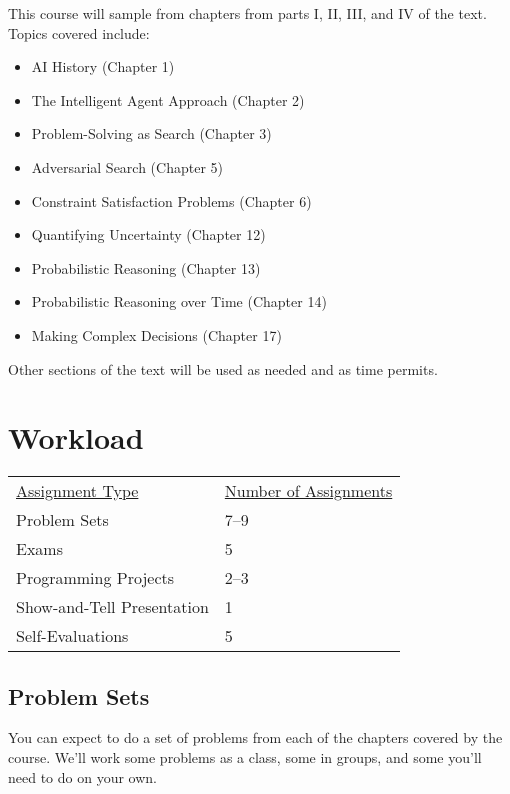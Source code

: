 \documentclass[10pt]{article}
\begin{document}
This course will sample from chapters from parts I, II, III, and IV of the text. Topics covered include:
\begin{itemize}
\item AI History (Chapter 1) %
\item The Intelligent Agent Approach (Chapter 2) %
\item Problem-Solving as Search (Chapter 3) %
\item Adversarial Search (Chapter 5) %
\item Constraint Satisfaction Problems (Chapter 6)
\item Quantifying Uncertainty (Chapter 12)
\item Probabilistic Reasoning (Chapter 13) %
\item Probabilistic Reasoning over Time (Chapter 14)
\item Making Complex Decisions (Chapter 17) %
\end{itemize}
Other sections of the text will be used as needed and as time permits.


\section{Workload}


\begin{center}
  \begin{tabular}{ll}
    \underline{Assignment Type} & \underline{Number of Assignments} \\
    Problem Sets & 7--9 \\
    Exams & 5 \\
    Programming Projects & 2--3 \\
    Show-and-Tell Presentation & 1 \\
    Self-Evaluations & 5 \\
  \end{tabular}
\end{center}

\subsection*{Problem Sets}

You can expect to do a set of problems from each of the chapters covered by the course. We'll work some problems as a class, some in groups, and some you'll need to do on your own.
\end{document}
